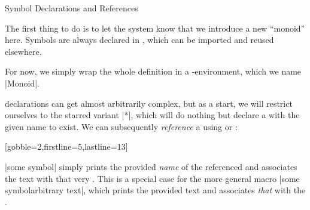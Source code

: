 \documentclass[lang={en,de}]{stex}
\begin{document}
  \begin{sfragment}{Symbol Declarations and References}


    The first thing to do is to let the system know that we introduce
    a new \emph{} ``monoid'' here. Symbols are always declared in
    \emph{}, which can be imported and reused elsewhere.


    For now, we simply
    wrap the whole definition in a -environment, which
    we name |Monoid|.

     declarations can get almost arbitrarily complex,
    but as a start, we will restrict ourselves to the starred
    variant |*|, which will do nothing but declare
    a  with the given name to exist.
    We can subsequently \emph{reference} a  using
     or :

    [gobble=2,firstline=5,lastline=13]

    |{some symbol}| simply prints the provided \emph{name}
    of the referenced  and associates the text with that
    very . This is a special case for the more general macro
    |{some symbol}{arbitrary text}|, which prints
    the provided text and associates \emph{that} with the . 
  \end{sfragment}
\end{document}
